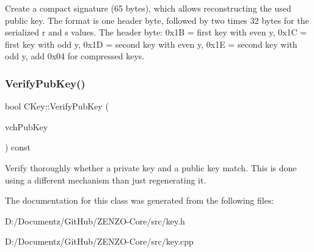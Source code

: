 Create a compact signature (65 bytes), which allows reconstructing the used public key. The format is one header byte, followed by two times 32 bytes for the serialized r and s values. The header byte\+: 0x1B = first key with even y, 0x1C = first key with odd y, 0x1D = second key with even y, 0x1E = second key with odd y, add 0x04 for compressed keys. \mbox{\label{class_c_key_ac53425b8d0f89067bce781c485101b20}} 
\subsubsection{\texorpdfstring{VerifyPubKey()}{VerifyPubKey()}}
{\footnotesize\ttfamily bool C\+Key\+::\+Verify\+Pub\+Key (\begin{DoxyParamCaption}\item[{const \mbox{\hyperlink{class_c_pub_key}{C\+Pub\+Key}} \&}]{vch\+Pub\+Key }\end{DoxyParamCaption}) const}

Verify thoroughly whether a private key and a public key match. This is done using a different mechanism than just regenerating it. 

The documentation for this class was generated from the following files\+:\begin{DoxyCompactItemize}
\item 
D\+:/\+Documentz/\+Git\+Hub/\+Z\+E\+N\+Z\+O-\/\+Core/src/key.\+h\item 
D\+:/\+Documentz/\+Git\+Hub/\+Z\+E\+N\+Z\+O-\/\+Core/src/key.\+cpp\end{DoxyCompactItemize}
